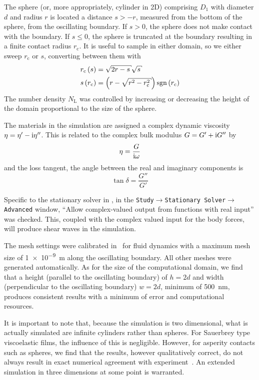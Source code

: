 The sphere (or, more appropriately, cylinder in 2D) comprising $D_1$ with
diameter $d$ and radius $r$ is located a distance $s>-r$, measured from the
bottom of the sphere, from the oscillating
boundary.  If $s>0$, the sphere does not make contact with the boundary.
If $s\leq0$, the sphere is truncated at the boundary resulting in a finite
contact radius $r_\mathrm{c}$.  It is useful to sample in either domain, so
we either sweep $r_\mathrm{c}$ or $s$, converting between them with
\begin{align}
 r_\mathrm{c}\left(s\right) &= \sqrt{2r-s}\sqrt{s}\\
 s\left(r_\mathrm{c}\right) &= \left(r-\sqrt{r^2-r_\mathrm{c}^2}\right)\sgn\left(r_\mathrm{c}\right)
\end{align}
The number density $N_\mathrm{L}$ was controlled by increasing or
decreasing the height of the domain proportional to the size of the sphere.

The materials in the simulation are assigned a complex dynamic viscosity
$\eta = \eta'-{\mathrm{i}}\eta''$.  This is related to the complex bulk modulus
$G=G'+{\mathrm{i}} G''$ by
\begin{align}
 \eta = \frac{G}{{\mathrm{i}} \omega}
\end{align}
and the loss tangent, the angle between the real and imaginary components
is 
\begin{equation}
 \tan \delta = \frac{G''}{G'}
\end{equation}

Specific to the stationary solver in \comsol, in the
\texttt{Study$\rightarrow$Stationary Solver$\rightarrow$Advanced} window,
``Allow complex-valued output from functions with real input'' was checked.
This, coupled with the complex valued input for the body forces, will
produce shear waves in the simulation.

The mesh settings were calibrated in \comsol~for fluid dynamics with a
maximum mesh size of \SI{1e-9}{\meter} along the oscillating boundary.  All
other meshes were generated automatically.  As for the size of the
computational domain, we find that a height (parallel to the oscillating
boundary) of $h=2d$ and width (perpendicular to the oscillating boundary)  
$w=2d$, minimum of \SI{500}{\nano\meter}, produces consistent results with a
minimum of error and computational resources.

It is important to note that, because the simulation is two dimensional,
what is actually simulated are infinite cylinders rather than spheres.  For
Sauerbrey type viscoelastic films, the influence of this is negligible.
However, for asperity contacts such as spheres, we find that the results,
however qualitatively correct, do not always result in exact numerical
agreement with experiment~\cite{Vittorias2010489}.  An extended simulation
in three dimensions at some point is warranted.

